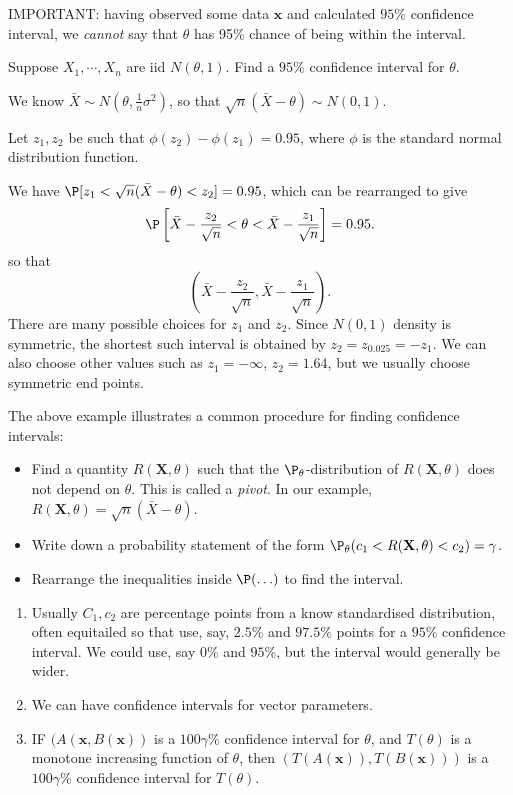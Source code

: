 \documentclass[a4paper]{article}
\begin{document}
IMPORTANT: having observed some data $\mathbf{x}$ and calculated $95\%$ confidence interval, we \emph{cannot} say that $\theta$ has 95\% chance of being within the interval.

\begin{eg}
  Suppose $X_1, \cdots, X_n$ are iid $N(\theta, 1)$. Find a $95\%$ confidence interval for $\theta$.

  We know $\bar X \sim N(\theta, \frac{1}{n}\sigma^2)$, so that $\sqrt{n}(\bar X - \theta)\sim N(0, 1)$.

  Let $z_1, z_2$ be such that $\phi(z_2) - \phi(z_1) = 0.95$, where $\phi$ is the standard normal distribution function.

  We have $\P[z_1 < \sqrt{n}(\bar X - \theta) < z_2] = 0.95$, which can be rearranged to give
  \[
    \P\left[\bar X - \frac{z_2}{\sqrt{n}} < \theta < \bar X - \frac{z_1}{\sqrt{n}}\right] = 0.95.
  \]
  so that
  \[
    \left(\bar X - \frac{z_2}{\sqrt{n}}, \bar X - \frac{z_1}{\sqrt{n}}\right).
  \]
  There are many possible choices for $z_1$ and $z_2$. Since $N(0, 1)$ density is symmetric, the shortest such interval is obtained by $z_2 = z_{0.025} = -z_1$. We can also choose other values such as $z_1 = -\infty$, $z_2 = 1.64$, but we usually choose symmetric end points.
\end{eg}
The above example illustrates a common procedure for finding confidence intervals:
\begin{itemize}
  \item Find a quantity $R(\mathbf{X}, \theta)$ such that the $\P_\theta$-distribution of $R(\mathbf{X}, \theta)$ does not depend on $\theta$. This is called a \emph{pivot}. In our example, $R(\mathbf{X}, \theta) = \sqrt{n}(\bar X - \theta)$.
  \item Write down a probability statement of the form $\P_\theta(c_1 < R(\mathbf{X}, \theta) < c_2) = \gamma$.
  \item Rearrange the inequalities inside $\P(\ldots)$ to find the interval.
\end{itemize}
\note
\begin{enumerate}
  \item Usually $C_1, c_2$ are percentage points from a know standardised distribution, often equitailed so that use, say, $2.5\%$ and $97.5\%$ points for a $95\%$ confidence interval. We could use, say $0\%$ and $95\%$, but the interval would generally be wider.
  \item We can have confidence intervals for vector parameters.
  \item IF $(A(\mathbf{x}, B(\mathbf{x}))$ is a $100\gamma\%$ confidence interval for $\theta$, and $T(\theta)$ is a monotone increasing function of $\theta$, then $(T(A(\mathbf{x})), T(B(\mathbf{x})))$ is a $100\gamma\%$ confidence interval for $T(\theta)$.
\end{enumerate}
\end{document}
